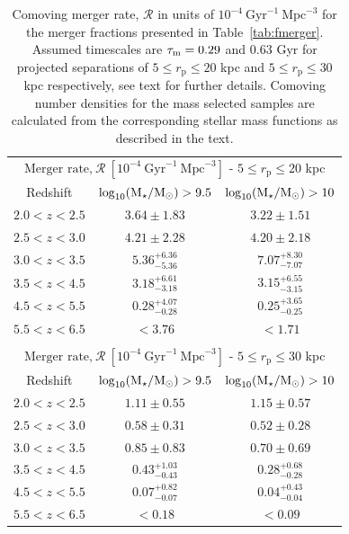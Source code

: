 \begin{table}
  \caption[Comoving merger rate, $\mathcal{R}$ in units of $10^{-4}~\text{Gyr}^{-1}~\text{Mpc}^{-3}$ for the merger fractions presented in Table~\ref{tab:fmerger}.]{Comoving merger rate, $\mathcal{R}$ in units of $10^{-4}~\text{Gyr}^{-1}~\text{Mpc}^{-3}$ for the merger fractions presented in Table~\ref{tab:fmerger}. Assumed timescales are $\tau_{\rm{m}} = 0.29$ and  $0.63$ Gyr for projected separations of $5 \leq r_{\text{p}} \leq 20$ kpc and $5 \leq r_{\text{p}} \leq 30$ kpc respectively, see text for further details. Comoving number densities for the mass selected samples are calculated from the corresponding stellar mass functions as described in the text.}
\centering
  \begin{tabular}{c|cc}
   \multicolumn{3}{c}{$\text{Merger~rate,}~\mathcal{R}~[10^{-4}~\text{Gyr}^{-1}~\text{Mpc}^{-3}]$ - $5 \leq r_{\text{p}} \leq 20$ kpc} \\ \noalign{\smallskip}
   Redshift  & $\log_{10}(\text{M}_{\star} / \text{M}_{\odot}) > 9.5$ & $\log_{10}(\text{M}_{\star} / \text{M}_{\odot}) > 10$ \\
    \hline
   $2.0 < z < 2.5$ & $3.64 \pm 1.83$ & $3.22 \pm 1.51$ \\
   $2.5 < z < 3.0$ & $4.21 \pm 2.28$ & $4.20 \pm 2.18$\\
   $3.0 < z < 3.5$ & $5.36^{+6.36}_{-5.36}$& $7.07^{+8.30}_{-7.07}$ \\
   $3.5 < z < 4.5$ & $3.18^{+6.61}_{-3.18}$& $3.15^{+6.55}_{-3.15}$ \\
   $4.5 < z < 5.5$ & $0.28^{+4.07}_{-0.28}$& $0.25^{+3.65}_{-0.25}$ \\
   $5.5 < z < 6.5$ & $<3.76$& $<1.71$\\  
    & & \\
    
   \multicolumn{3}{c}{$\text{Merger~rate,}~\mathcal{R}~[10^{-4}~\text{Gyr}^{-1}~\text{Mpc}^{-3}]$ - $5 \leq r_{\text{p}} \leq 30$ kpc} \\ \noalign{\smallskip}
   Redshift & $\log_{10}(\text{M}_{\star} / \text{M}_{\odot}) > 9.5$ & $\log_{10}(\text{M}_{\star} / \text{M}_{\odot}) > 10$ \\
    \hline
   $2.0 < z < 2.5$ & $1.11 \pm 0.55$ & $1.15 \pm 0.57$ \\
   $2.5 < z < 3.0$ & $0.58 \pm 0.31$ & $0.52 \pm 0.28$\\
   $3.0 < z < 3.5$ & $0.85 \pm 0.83$ & $0.70 \pm 0.69$ \\
   $3.5 < z < 4.5$ & $0.43^{+1.03}_{-0.43}$& $0.28^{+0.68}_{-0.28}$ \\
   $4.5 < z < 5.5$ & $0.07^{+0.82}_{-0.07}$& $0.04^{+0.43}_{-0.04}$ \\
   $5.5 < z < 6.5$ & $<0.18$ & $<0.09$\\  
    
  \end{tabular}\label{tab:merger_rate_dens}
\end{table}

